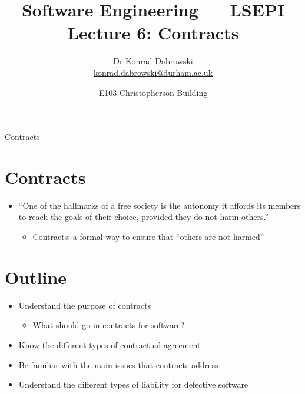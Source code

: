 \documentclass{article}
\title{Software Engineering --- LSEPI Lecture 6: Contracts}
\author{Dr Konrad Dabrowski\\
\href{mailto://konrad.dabrowski@durham.ac.uk}{konrad.dabrowski@durham.ac.uk}
}
\date{E103 Christopherson Building}
\begin{document}
\begin{center}
	\underline{\huge Contracts}
\end{center}





\section{Contracts}
\begin{itemize}
\item ``One of the hallmarks of a free society is the autonomy it affords its members to reach the goals of their choice, provided they do not harm others.''
\begin{itemize}
\item Contracts: a formal way to ensure that ``others are not harmed''
\end{itemize}
\end{itemize}



\section{Outline}
\begin{itemize}
\item Understand the purpose of contracts
\begin{itemize}
\item What should go in contracts for software?
\end{itemize}
\item Know the different types of contractual agreement
\item Be familiar with the main issues that contracts address
\item Understand the different types of liability for defective software
\end{itemize}
\end{document}
